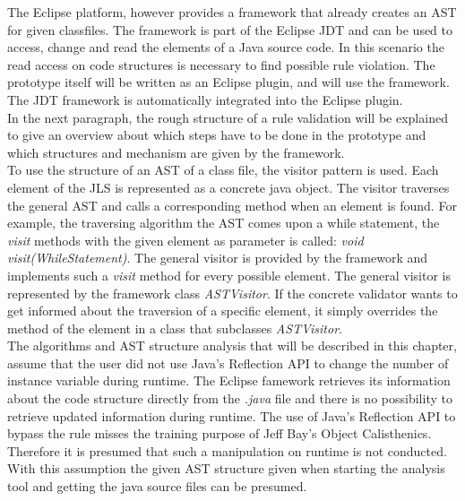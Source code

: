 The Eclipse platform, however provides a framework that already creates an \ac{AST} for given classfiles. The framework is part of the Eclipse \ac{JDT} and can be used to access, change and read the elements of a Java source code. In this scenario the read access on code structures is necessary to find possible rule violation. The prototype itself will be written as an Eclipse plugin, and will use the framework. The \ac{JDT} framework is automatically integrated into the Eclipse plugin. 
\\


In the next paragraph, the rough structure of a rule validation will be explained to give an overview about which steps have to be done in the prototype and which structures and mechanism are given by the framework.
\\

To use the structure of an \ac{AST} of a class file, the visitor pattern \cite[p. 366]{gof} is used. Each element of the \ac{JLS} is represented as a concrete java object. The visitor traverses the general \ac{AST} and calls a corresponding method when an element is found. For example, the traversing algorithm the \ac{AST} comes upon a while statement, the \textit{visit} methods with the given element as parameter is called: \textit{void visit(WhileStatement)}. The general visitor is provided by the framework and implements such a \textit{visit} method for every possible element. The general visitor is represented by the framework class \textit{ASTVisitor}. If the concrete validator wants to get informed about the traversion of a specific element, it simply overrides the method of the element in a class that subclasses \textit{ASTVisitor}. 
\\

The algorithms and \ac{AST} structure analysis that will be described in this chapter, assume that the user did not use Java's Reflection \ac{API} to change the number of instance variable during runtime. The Eclipse famework retrieves its information about the code structure directly from the \textit{.java} file and there is no possibility to retrieve updated information during runtime. The use of Java's Reflection \ac{API} to bypass the rule misses the training purpose of Jeff Bay's Object Calisthenics.  Therefore it is presumed that such a manipulation on runtime is not conducted. With this assumption the given \ac{AST} structure given when starting the analysis tool and getting the java source files can be presumed.
\\

